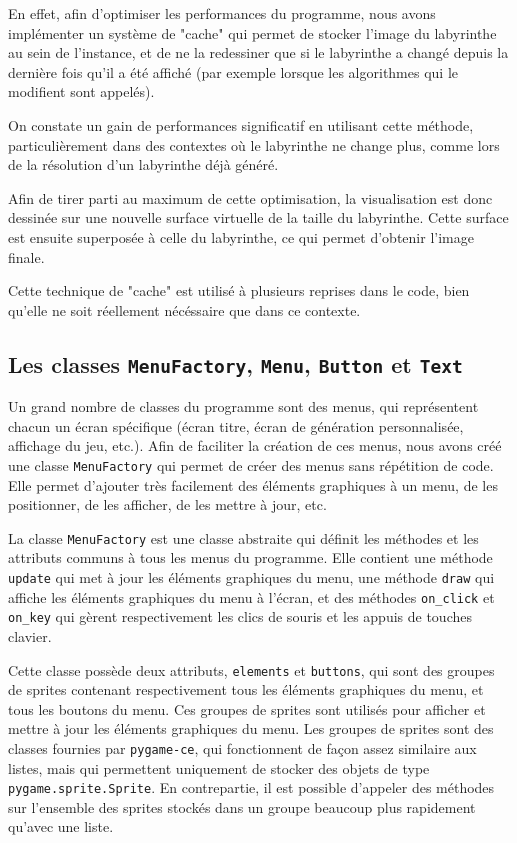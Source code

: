 \documentclass[12pt]{scrreprt} %
\begin{document}
En effet, afin d'optimiser les performances du programme, nous avons implémenter un système de "cache" qui permet de stocker l'image du labyrinthe au sein de l'instance, et de ne la redessiner que si le labyrinthe a changé depuis la dernière fois qu'il a été affiché (par exemple lorsque les algorithmes qui le modifient sont appelés).

On constate un gain de performances significatif en utilisant cette méthode, particulièrement dans des contextes où le labyrinthe ne change plus, comme lors de la résolution d'un labyrinthe déjà généré.

Afin de tirer parti au maximum de cette optimisation, la visualisation est donc dessinée sur une nouvelle surface virtuelle de la taille du labyrinthe. Cette surface est ensuite superposée à celle du labyrinthe, ce qui permet d'obtenir l'image finale.

Cette technique de "cache" est utilisé à plusieurs reprises dans le code, bien qu'elle ne soit réellement nécéssaire que dans ce contexte.

\subsection{Les classes \texttt{MenuFactory}, \texttt{Menu}, \texttt{Button} et \texttt{Text}}

Un grand nombre de classes du programme sont des menus, qui représentent chacun un écran spécifique (écran titre, écran de génération personnalisée, affichage du jeu, etc.). Afin de faciliter la création de ces menus, nous avons créé une classe \texttt{MenuFactory} qui permet de créer des menus sans répétition de code. Elle permet d'ajouter très facilement des éléments graphiques à un menu, de les positionner, de les afficher, de les mettre à jour, etc.


La classe \texttt{MenuFactory} est une classe abstraite qui définit les méthodes et les attributs communs à tous les menus du programme. Elle contient une méthode \texttt{update} qui met à jour les éléments graphiques du menu, une méthode \texttt{draw} qui affiche les éléments graphiques du menu à l'écran, et des méthodes \texttt{on\_click} et \texttt{on\_key} qui gèrent respectivement les clics de souris et les appuis de touches clavier.

Cette classe possède deux attributs, \texttt{elements} et \texttt{buttons}, qui sont des groupes de sprites contenant respectivement tous les éléments graphiques du menu, et tous les boutons du menu. Ces groupes de sprites sont utilisés pour afficher et mettre à jour les éléments graphiques du menu. Les groupes de sprites sont des classes fournies par \texttt{pygame-ce}, qui fonctionnent de façon assez similaire aux listes, mais qui permettent uniquement de stocker des objets de type \texttt{pygame.sprite.Sprite}. En contrepartie, il est possible d'appeler des méthodes sur l'ensemble des sprites stockés dans un groupe beaucoup plus rapidement qu'avec une liste.
\end{document}
